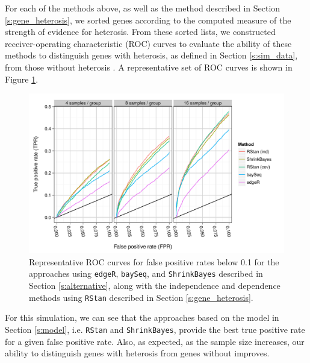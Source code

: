 \documentclass[useAMS,usenatbib,referee]{biom}
\newcommand{\RStan}{{\tt RStan}}
\newcommand{\edgeR}{{\tt edgeR}}
\newcommand{\ShrinkBayes}{{\tt ShrinkBayes}}
\begin{document}
For each of the methods above, as well as the method described in Section \ref{s:gene_heterosis}, we sorted genes according to the computed measure of the strength of evidence for heterosis. From these sorted lists, we constructed receiver-operating characteristic (ROC) curves to evaluate the ability of these methods to distinguish genes with heterosis, as defined in Section \ref{s:sim_data}, 
from those without heterosis \citep{landau2013dispersion}. A representative set of ROC curves is shown in Figure \ref{f:roc}. 
\begin{figure}[htbp]
\centerline{\includegraphics[width=\textwidth]{exampleROC0_1}}
\caption{Representative ROC curves for false positive rates below 0.1 for the approaches using \edgeR{}, {\tt baySeq},  and \ShrinkBayes{} described in Section \ref{s:alternative}, along with the independence and dependence methods using \RStan{} described in Section \ref{s:gene_heterosis}.}
\label{f:roc}
\end{figure}
For this simulation, we can see that the approaches based on the model in Section \ref{s:model}, i.e. \RStan{} and \ShrinkBayes{}, provide the best true positive rate for a given false positive rate. Also, as expected, as the sample size increases, our ability to distinguish genes with heterosis from genes without improves.
\end{document}
